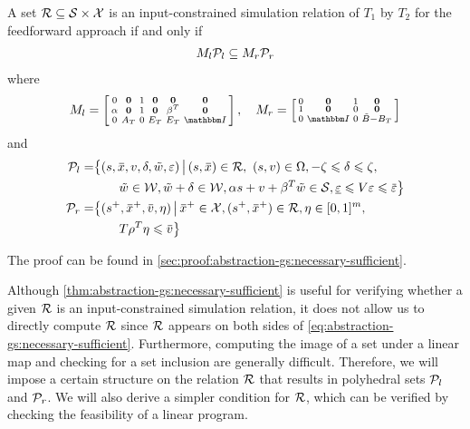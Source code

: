 \begin{theorem}
  \label{thm:abstraction-gs:necessary-sufficient}
  A set $\mathcal{R} \subseteq \mathcal{S} \times \mathcal{X}$ is an input-constrained simulation relation of $T_{1}$ by $T_{2}$ for the feedforward approach if and only if
  \begin{align}
    \label{eq:abstraction-gs:necessary-sufficient}
    M_l \mathcal{P}_l \subseteq M_r \mathcal{P}_r
  \end{align}
  where 
  \begin{gather*}
    M_l =
    \left[\begin{smallmatrix}
        0 & \Zero & 1 & \Zero & \Zero & \Zero \\
        \alpha & \Zero & 1 & \Zero & \beta^{T} & \Zero \\
        0 & A_T & 0 & E_T & E_T & \IdentityMatrix
      \end{smallmatrix}\right], \quad
    M_r =
    \left[\begin{smallmatrix}
        0 & \Zero & 1 & \Zero \\
        1 & \Zero & 0 & \Zero \\
        0 & \IdentityMatrix & 0 & \tilde{B} - B_{T}
      \end{smallmatrix}\right]
  \end{gather*}
  and
  \begin{align*}
    \PSet_l =& \big\{ (s,\overbar{x}, v, \delta, \tilde{w}, \varepsilon) \,\big|\,
              (s,\overbar{x}) \in \RSet,\ (s,v) \in \Omega, -\zeta \leqslant \delta \leqslant \zeta,\big.\\
            &\qquad \big. \tilde{w} \in \WSet, \tilde{w} + \delta \in \WSet, \alpha s + v + \beta^{T} \tilde{w} \in \SSet, \underline{\varepsilon} \leqslant V \varepsilon \leqslant \overbar{\varepsilon} \big\} \\
    \PSet_r =& \big\{(s^+, \overbar{x}^{+}, \overbar{v}, \eta) \,\big|\,
               \overbar{x}^{+} \in \XSet, (s^{+}, \overbar{x}^{+}) \in \RSet, \eta \in [0,1]^{m},\big.\\
             &\qquad \big. T \rho^{T} \eta \leqslant \overbar{v}\big\}
  \end{align*}
\end{theorem}
The proof can be found in \cref{sec:proof:abstraction-gs:necessary-sufficient}.

Although \cref{thm:abstraction-gs:necessary-sufficient} is useful for verifying whether a given $\mathcal{R}$ is an input-constrained simulation relation, it does not allow us to directly compute $\mathcal{R}$ since $\mathcal{R}$ appears on both sides of \eqref{eq:abstraction-gs:necessary-sufficient}.
Furthermore, computing the image of a set under a linear map and checking for a set inclusion are generally difficult.
Therefore, we will impose a certain structure on the relation $\mathcal{R}$ that results in polyhedral sets $\mathcal{P}_{l}$ and $\mathcal{P}_{r}$.
We will also derive a simpler condition for $\mathcal{R}$, which can be verified by checking the feasibility of a linear program.

